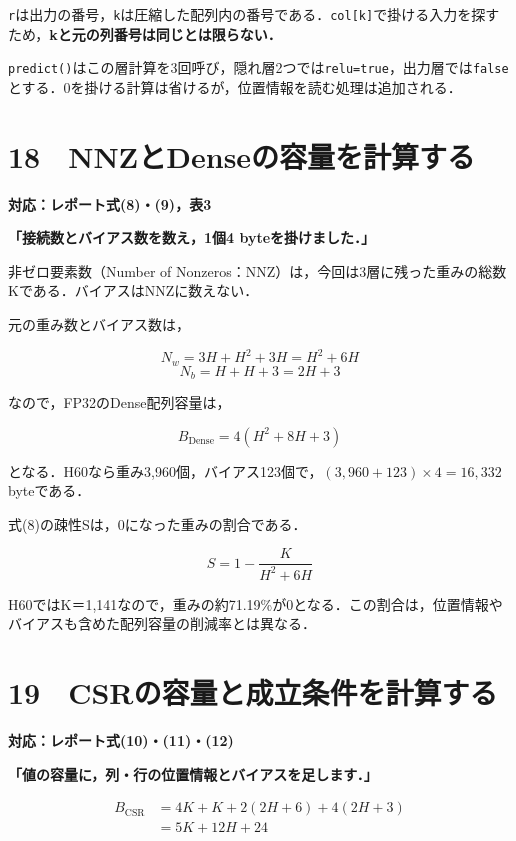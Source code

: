 \documentclass[
  14pt,
  a5paper,
]{extarticle}
\begin{document}
\texttt{r}は出力の番号，\texttt{k}は圧縮した配列内の番号である．\texttt{col{[}k{]}}で掛ける入力を探すため，\textbf{kと元の列番号は同じとは限らない．}

\texttt{predict()}はこの層計算を3回呼び，隠れ層2つでは\texttt{relu=true}，出力層では\texttt{false}とする．0を掛ける計算は省けるが，位置情報を読む処理は追加される．

\newpage

\section{18　NNZとDenseの容量を計算する}\label{nnzux3068denseux306eux5bb9ux91cfux3092ux8a08ux7b97ux3059ux308b}

\textbf{対応：レポート式(8)・(9)，表3}

\textbf{「接続数とバイアス数を数え，1個4 byteを掛けました．」}

非ゼロ要素数（Number of
Nonzeros：NNZ）は，今回は3層に残った重みの総数Kである．バイアスはNNZに数えない．

元の重み数とバイアス数は，

\[N_w=3H+H^2+3H=H^2+6H\] \[N_b=H+H+3=2H+3\]

なので，FP32のDense配列容量は，

\[B_{\mathrm{Dense}}=4(H^2+8H+3)\]

となる．H60なら重み3,960個，バイアス123個で，\((3,960+123)\times4=16,332\)
byteである．

式(8)の疎性Sは，0になった重みの割合である．

\[S=1-\frac{K}{H^2+6H}\]

H60ではK＝1,141なので，重みの約71.19\%が0となる．この割合は，位置情報やバイアスも含めた配列容量の削減率とは異なる．

\newpage

\section{19　CSRの容量と成立条件を計算する}\label{csrux306eux5bb9ux91cfux3068ux6210ux7acbux6761ux4ef6ux3092ux8a08ux7b97ux3059ux308b}

\textbf{対応：レポート式(10)・(11)・(12)}

\textbf{「値の容量に，列・行の位置情報とバイアスを足します．」}

\[\begin{aligned}
B_{\mathrm{CSR}}
&=4K+K+2(2H+6)+4(2H+3)\\
&=5K+12H+24
\end{aligned}\]
\end{document}
